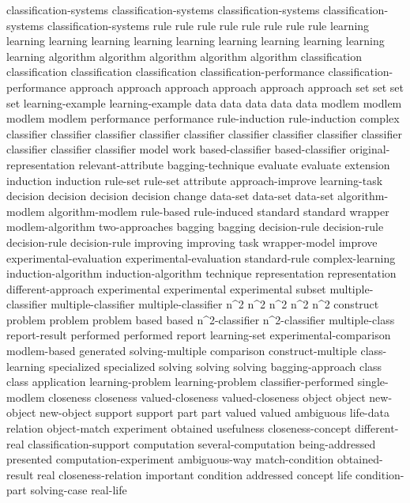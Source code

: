 classification-systems	classification-systems	classification-systems	classification-systems	classification-systems	
rule	rule	rule	rule	rule	rule	rule	rule	
learning	learning	learning	learning	learning	learning	learning	learning	learning	learning	learning	
algorithm	algorithm	algorithm	algorithm	algorithm	
classification	classification	classification	classification	
classification-performance	classification-performance	
approach	approach	approach	approach	approach	approach	
set	set	set	set	
learning-example	learning-example	
data	data	data	data	data	
modlem	modlem	modlem	modlem	
performance	performance	
rule-induction	rule-induction	
complex	
classifier	classifier	classifier	classifier	classifier	classifier	classifier	classifier	classifier	classifier	classifier	classifier	
model	
work	
based-classifier	based-classifier	
original-representation	
relevant-attribute	
bagging-technique	
evaluate	evaluate	
extension	
induction	induction	
rule-set	rule-set	
attribute	
approach-improve	
learning-task	
decision	decision	decision	decision	
change	
data-set	data-set	data-set	
algorithm-modlem	algorithm-modlem	
rule-based	
rule-induced	
standard	standard	
wrapper	
modlem-algorithm	
two-approaches	
bagging	bagging	
decision-rule	decision-rule	decision-rule	decision-rule	
improving	improving	
task	
wrapper-model	
improve	
experimental-evaluation	experimental-evaluation	
standard-rule	
complex-learning	
induction-algorithm	induction-algorithm	
technique	
representation	representation	
different-approach	
experimental	experimental	experimental	
subset	
multiple-classifier	multiple-classifier	multiple-classifier	
n^2	n^2	n^2	n^2	n^2	
construct	
problem	problem	problem	
based	based	
n^2-classifier	n^2-classifier	
multiple-class	
report-result	
performed	performed	
report	
learning-set	
experimental-comparison	
modlem-based	
generated	
solving-multiple	
comparison	
construct-multiple	
class-learning	
specialized	specialized	
solving	solving	solving	
bagging-approach	
class	class	
application	
learning-problem	learning-problem	
classifier-performed	
single-modlem	
closeness	closeness	
valued-closeness	valued-closeness	
object	object	
new-object	new-object	
support	support	
part	part	
valued	valued	
ambiguous	
life-data	
relation	
object-match	
experiment	
obtained	
usefulness	
closeness-concept	
different-real	
classification-support	
computation	
several-computation	
being-addressed	
presented	
computation-experiment	
ambiguous-way	
match-condition	
obtained-result	
real	
closeness-relation	
important	
condition	
addressed	
concept	
life	
condition-part	
solving-case	
real-life	
